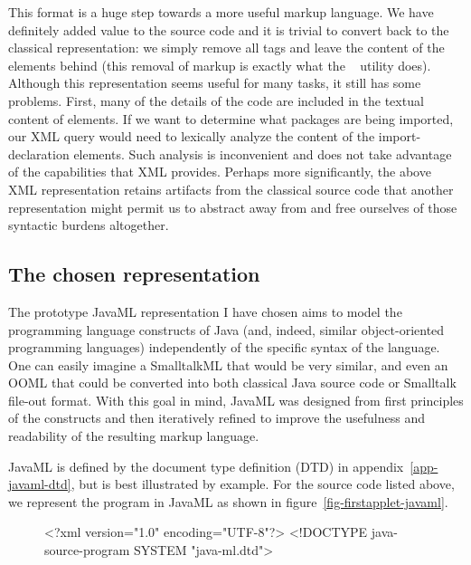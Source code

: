 \documentclass{article}
\begin{document}
\begin{multicols}{2}
This format is a huge step towards a more useful markup language.  We
have definitely added value to the source code and it is trivial to
convert back to the classical representation: we simply remove all tags
and leave the content of the elements behind (this removal of markup is
exactly what the ~\cite{perlSGML} utility does).
Although this representation seems useful for many tasks, it still has
some problems.  First, many of the details of the code are included in
the textual content of elements.  If we want to determine what packages
are being imported, our XML query would need to lexically analyze the
content of the import-declaration elements.  Such analysis is
inconvenient and does not take advantage of the capabilities that XML
provides.  Perhaps more significantly, the above XML representation
retains artifacts from the classical source code that another
representation might permit us to abstract away from and free ourselves
of those syntactic burdens altogether.

\subsection{The chosen representation}

The prototype JavaML representation I have chosen aims to model the
programming language constructs of Java (and, indeed, similar
object-oriented programming languages) independently of the specific
syntax of the language.  One can easily imagine a SmalltalkML that would
be very similar, and even an OOML that could be converted into both
classical Java source code or Smalltalk file-out format.  With this goal
in mind, JavaML was designed from first principles of the constructs and
then iteratively refined to improve the usefulness and readability of
the resulting markup language.

JavaML is defined by the document type definition (DTD) in
appendix~\ref{app-javaml-dtd}, but is best illustrated by example.  For the
 source code listed above, we represent the
program in JavaML as shown in figure~\ref{fig-firstapplet-javaml}.

\begin{figure}[p]
\begin{listing}{1}
<?xml version="1.0" encoding="UTF-8"?>
<!DOCTYPE java-source-program SYSTEM "java-ml.dtd">


\end{listing}
\end{figure}
\end{multicols}
\end{document}
